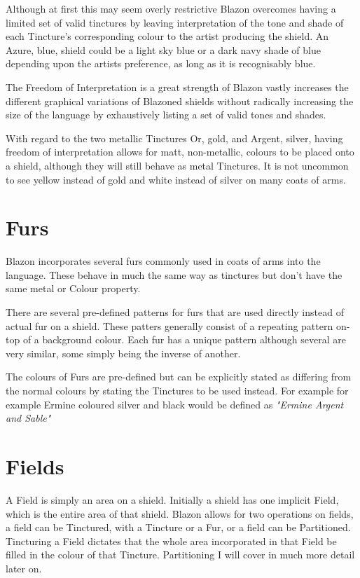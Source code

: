 Although at first this may seem overly restrictive Blazon overcomes having a limited set of valid tinctures by leaving interpretation of the tone and shade of each Tincture's corresponding colour to the artist producing the shield. 
An Azure, blue, shield could be a light sky blue or a dark navy shade of blue depending upon the artists preference, as long as it is recognisably blue. 

The Freedom of Interpretation is a great strength of Blazon vastly increases the different graphical variations of Blazoned shields without radically increasing the size of the language by exhaustively listing a set of valid tones and shades. 

With regard to the two metallic Tinctures Or, gold, and Argent, silver, having freedom of interpretation allows for matt, non-metallic, colours to be placed onto a shield, although they will still behave as metal Tinctures.  It is not uncommon to see yellow instead of gold and white instead of silver on many coats of arms.


\section{Furs}

Blazon incorporates several furs commonly used in coats of arms into the language.  These behave in much the same way as tinctures but don't have the same metal or Colour property.

There are several pre-defined patterns for furs that are used directly instead of actual fur on a shield.  These patters generally consist of a repeating pattern on-top of a background colour.  Each fur has a unique pattern although several are very similar, some simply being the inverse of another.

The colours of Furs are pre-defined but can be explicitly stated as differing from the normal colours  by stating the Tinctures to be used instead.  For example for example Ermine coloured silver and black would be defined as \emph{"Ermine Argent and Sable"} 


\section{Fields}
A Field is simply an area on a shield.  Initially a shield has one implicit Field, which is the entire area of that shield.  Blazon allows for two operations on fields, a field can be Tinctured, with a Tincture or a Fur, or a field can be Partitioned. 
Tincturing a Field dictates that the whole area incorporated in that Field be filled in the colour of that Tincture.  Partitioning I will cover in much more detail later on.


